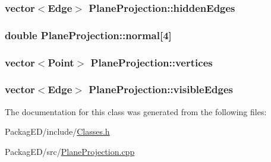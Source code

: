 \subsubsection[{\texorpdfstring{hidden\+Edges}{hiddenEdges}}]{\setlength{\rightskip}{0pt plus 5cm}vector$<${\bf Edge}$>$ Plane\+Projection\+::hidden\+Edges}\hypertarget{class_plane_projection_ab66dbf817366f25e9e989f987d5f2c71}{}\label{class_plane_projection_ab66dbf817366f25e9e989f987d5f2c71}
\subsubsection[{\texorpdfstring{normal}{normal}}]{\setlength{\rightskip}{0pt plus 5cm}double Plane\+Projection\+::normal\mbox{[}4\mbox{]}}\hypertarget{class_plane_projection_a3741978f1a0ad2b5fcd6a1aac4678f93}{}\label{class_plane_projection_a3741978f1a0ad2b5fcd6a1aac4678f93}
\subsubsection[{\texorpdfstring{vertices}{vertices}}]{\setlength{\rightskip}{0pt plus 5cm}vector$<${\bf Point}$>$ Plane\+Projection\+::vertices}\hypertarget{class_plane_projection_aa87b142fcdadad8437f3c733cba84e53}{}\label{class_plane_projection_aa87b142fcdadad8437f3c733cba84e53}
\subsubsection[{\texorpdfstring{visible\+Edges}{visibleEdges}}]{\setlength{\rightskip}{0pt plus 5cm}vector$<${\bf Edge}$>$ Plane\+Projection\+::visible\+Edges}\hypertarget{class_plane_projection_af0213c6d4a2dab2651f070215ebec049}{}\label{class_plane_projection_af0213c6d4a2dab2651f070215ebec049}


The documentation for this class was generated from the following files\+:\begin{DoxyCompactItemize}
\item 
Packag\+E\+D/include/\hyperlink{_classes_8h}{Classes.\+h}\item 
Packag\+E\+D/src/\hyperlink{_plane_projection_8cpp}{Plane\+Projection.\+cpp}\end{DoxyCompactItemize}
